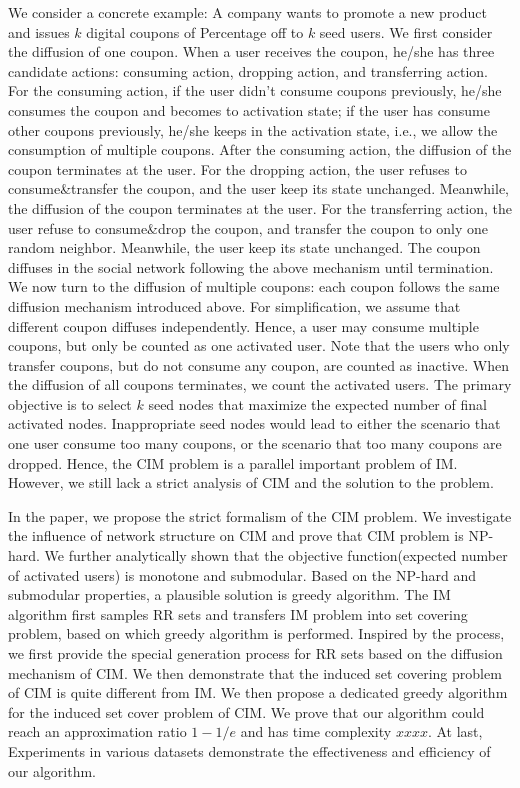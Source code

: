 \documentclass[sigconf]{acmart}
\begin{document}
We consider a concrete example:
A company wants to promote a new product and issues $k$ digital coupons of Percentage off
to $k$ seed users. We first consider the diffusion of one coupon. When a user receives the coupon, he/she has three candidate actions: consuming action, dropping action, and transferring action. For the consuming action, if the user didn't consume coupons previously, he/she consumes the coupon and becomes to activation state; if the user has consume other coupons previously, he/she keeps in the activation state, i.e., we allow the consumption of multiple coupons. After the consuming action, the diffusion of the coupon terminates at the user.
 For the dropping action, the user refuses to consume\&transfer the coupon, and the user keep its state unchanged. Meanwhile, the diffusion of the coupon terminates at the user.
 For the transferring action, the user refuse to consume\&drop the coupon, and transfer the coupon to only one random neighbor. Meanwhile, the user keep its state unchanged. The coupon diffuses in the social network following the above mechanism until termination. We now turn to the diffusion of multiple coupons: each coupon follows the same diffusion mechanism introduced above.
  For simplification, we assume that different coupon diffuses independently. Hence, a user may consume multiple coupons, but only be counted as one activated user. Note that the users who only transfer coupons, but do not consume any coupon, are counted as inactive. 
 When the diffusion of all coupons terminates, we count the activated users. 
The primary objective is to select $k$ seed nodes that maximize the
expected number of final activated nodes. Inappropriate seed nodes would lead to either the scenario that one user consume too many coupons, or the scenario that too many coupons are dropped. Hence, the CIM problem is a parallel important problem of IM. However, we still lack a strict analysis of CIM and the solution to the problem.


In the paper, we propose the strict formalism of the CIM problem. We investigate the influence of network structure on CIM and prove that CIM problem is NP-hard. We further analytically shown that 
the objective function(expected number of activated users) is monotone and submodular. Based on the NP-hard and submodular properties,  a plausible solution is greedy algorithm. The IM algorithm first samples RR sets and transfers IM problem into set covering problem, based on which greedy algorithm is performed. Inspired by the process, we first provide the special generation process for RR sets based on the diffusion mechanism of CIM. We then demonstrate that the induced set covering problem of CIM is quite different from IM. We then propose a dedicated greedy algorithm for the induced set cover problem of CIM. We prove that our algorithm could reach an approximation ratio $1-1/e$ and has time complexity \textcolor[rgb]{1.00,0.00,0.00}{$xxxx$}. At last, Experiments in various datasets demonstrate the effectiveness and efficiency of our algorithm. 
\end{document}
